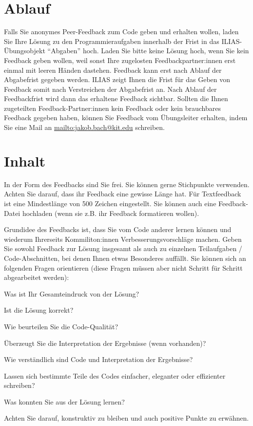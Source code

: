 \documentclass[headinclude,headsepline]{scrartcl}
\begin{document}
\section*{Ablauf}

Falls Sie anonymes Peer-Feedback zum Code geben und erhalten wollen, laden Sie Ihre Lösung zu den Programmieraufgaben innerhalb der Frist in das ILIAS-Übungsobjekt ``Abgaben'' hoch.
Laden Sie bitte keine Lösung hoch, wenn Sie kein Feedback geben wollen, weil sonst Ihre zugelosten Feedbackpartner:innen erst einmal mit leeren Händen dastehen.
Feedback kann erst nach Ablauf der Abgabefrist gegeben werden.
ILIAS zeigt Ihnen die Frist für das Geben von Feedback somit nach Verstreichen der Abgabefrist an.
Nach Ablauf der Feedbackfrist wird dann das erhaltene Feedback sichtbar.
Sollten die Ihnen zugeteilten Feedback-Partner:innen kein Feedback oder kein brauchbares Feedback gegeben haben,
können Sie Feedback vom Übungsleiter erhalten, indem Sie eine Mail an \url{mailto:jakob.bach@kit.edu} schreiben.

\section*{Inhalt}

In der Form des Feedbacks sind Sie frei.
Sie können gerne Stichpunkte verwenden.
Achten Sie darauf, dass ihr Feedback eine gewisse Länge hat.
Für Textfeedback ist eine Mindestlänge von 500 Zeichen eingestellt.
Sie können auch eine Feedback-Datei hochladen (wenn sie z.B. ihr Feedback formatieren wollen).

Grundidee des Feedbacks ist, dass Sie vom Code anderer lernen können und wiederum Ihrerseits Kommiliton:innen Verbesserungsvorschläge machen.
Geben Sie sowohl Feedback zur Lösung insgesamt als auch zu einzelnen Teilaufgaben / Code-Abschnitten, bei denen Ihnen etwas Besonderes auffällt.
Sie können sich an folgenden Fragen orientieren (diese Fragen müssen aber nicht Schritt für Schritt abgearbeitet werden):

\vspace{10pt}

\begin{compactenum}[a)]
	\item Was ist Ihr Gesamteindruck von der Lösung?
	\item Ist die Lösung korrekt?
	\item Wie beurteilen Sie die Code-Qualität?
	\item Überzeugt Sie die Interpretation der Ergebnisse (wenn vorhanden)?
	\item Wie verständlich sind Code und Interpretation der Ergebnisse?
	\item Lassen sich bestimmte Teile des Codes einfacher, eleganter oder effizienter schreiben?
	\item Was konnten Sie aus der Lösung lernen?
\end{compactenum}

\vspace{10pt}

Achten Sie darauf, konstruktiv zu bleiben und auch positive Punkte zu erwähnen.
\end{document}
